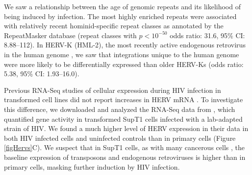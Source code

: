 \documentclass[../sherrill-Mix_thesis.tex]{subfiles}
\begin{document}
		We saw a relationship between the age of genomic repeats and its likelihood of being induced by \hivEight{} infection. The most highly enriched repeats were associated with relatively recent hominid-specific repeat classes as annotated by the RepeatMasker database (repeat classes with $p<10^{-50}$ odds ratio: 31.6, 95\% CI: 8.88--112). In HERV-K (HML-2), the most recently active endogenous retrovirus in the human genome \citep{Medstrand1998,Macfarlane2004,Subramanian2011}, we saw that integrations unique to the human genome \citep{Subramanian2011} were more likely to be differentially expressed than older HERV-Ks (odds ratio: 5.38, 95\% CI: 1.93--16.0). 

		Previous RNA-Seq studies of cellular expression during HIV infection in transformed cell lines did not report increases in HERV mRNA \citep{Lefebvre2011,Chang2011}. To investigate this difference, we downloaded and analyzed the RNA-Seq data from \citet{Chang2011}, which quantified gene activity in transformed SupT1 cells infected with a lab-adapted strain of HIV.  We found a much higher level of HERV expression in their data in both HIV infected cells and uninfected controls than in primary cells (Figure \ref{figHervs}C). We suspect that in SupT1 cells, as with many cancerous cells \citep{Buescher2005,Howard2008,Iskow2010,Lee2012,Criscione2014}, the baseline expression of transposons and endogenous retroviruses is higher than in primary cells, masking further induction by HIV infection.
\end{document}
